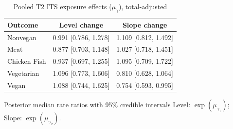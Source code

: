 \begin{table}[H]
\centering
\caption{Pooled T2 ITS exposure effects ($\mu_\gamma$), total-adjusted}
\label{tab:a3_t2_mu_gamma_adj}
\begin{tabular}{lcc}
\toprule
Outcome & Level change & Slope change \\
\midrule
Nonvegan & 0.991 [0.786, 1.278] & 1.109 [0.812, 1.492] \\
Meat & 0.877 [0.703, 1.148] & 1.027 [0.718, 1.451] \\
Chicken Fish & 0.937 [0.697, 1.255] & 1.095 [0.709, 1.722] \\
Vegetarian & 1.096 [0.773, 1.606] & 0.810 [0.628, 1.064] \\
Vegan & 1.088 [0.744, 1.625] & 0.754 [0.593, 0.995] \\
\bottomrule
\end{tabular}
\par\smallskip\footnotesize Posterior median rate ratios with 95\% credible intervals Level: $\exp(\mu_{\gamma_1})$; Slope: $\exp(\mu_{\gamma_2})$.
\end{table}
